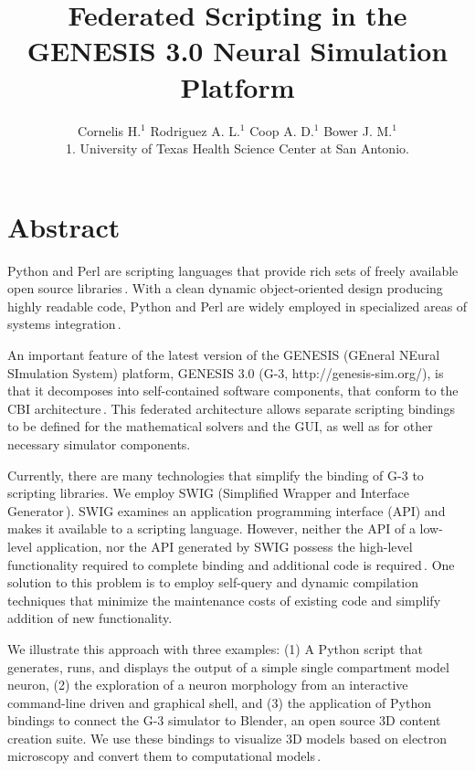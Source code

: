 \documentclass[12pt]{article}
\begin{document}
\title{\bf Federated Scripting in the GENESIS 3.0 Neural Simulation
  Platform}

\author{Cornelis H.$^1$ Rodriguez A. L.$^1$ Coop A. D.$^1$ Bower J. M.$^1$\\
  {\small 1. University of Texas Health Science Center at San Antonio.}
}

\maketitle
{}
\newpage
\section*{Abstract}
Python and Perl are scripting languages that provide rich sets of
freely available open source
libraries\,\cite{langtangen04:_python_scrip_comput_scien,valiente09:_combin_patter_match_algor_comput}.
With a clean dynamic object-oriented design producing highly readable
code, Python and Perl are widely employed in specialized areas of
systems
integration\,\cite{thiruvathukal01:_web_progr_python, lee07:_open_sourc_devel_lamp}.

An important feature of the latest version of the GENESIS (GEneral
NEural SImulation System) platform, GENESIS 3.0 (G-3,
http://genesis-sim.org/), is that it decomposes into self-contained
software components, that conform to the CBI
architecture\,\cite{cornelis08:_cbi_archit_comput_simul_realis}.  This
federated architecture allows separate scripting bindings to be
defined for the mathematical solvers and the GUI, as well as for other
necessary simulator components.

Currently, there are many technologies that simplify the binding of
G-3 to scripting libraries.  We employ SWIG (Simplified Wrapper and
Interface Generator\,\cite{08:_simpl_wrapp_inter_gener}).  SWIG
examines an application programming interface (API) and makes it
available to a scripting language.  However, neither the API of a
low-level application, nor the API generated by SWIG possess the
high-level functionality required to complete binding and additional
code is required\,\cite{08:_swig_python,08:_swig_perl}. One
solution to this problem is to employ self-query and dynamic
compilation techniques that minimize the maintenance costs of existing
code and simplify addition of new functionality.

We illustrate this approach with three examples: (1) A Python script
that generates, runs, and displays the output of a simple single
compartment model neuron, (2) the exploration of a neuron morphology
from an interactive command-line driven and graphical shell, and (3)
the application of Python bindings to connect the G-3 simulator to
Blender, an open source 3D content creation suite.  We use these
bindings to visualize 3D models based on electron microscopy and
convert them to computational
models\,\cite{cornelis08:_model_neuros_genes}.
\end{document}
